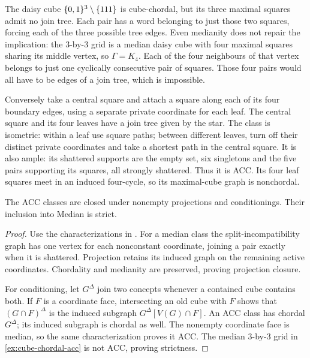 \begin{example}
\label{ex:cube-chordal-acc}
The daisy cube $\{0,1\}^3\setminus\{111\}$ is cube-chordal, but its three
maximal squares admit no join tree. Each pair has a word belonging to
just those two squares, forcing each of the three possible tree edges.
Even medianity does not repair the implication: the $3$-by-$3$ grid is
a median daisy cube with four maximal squares sharing its middle vertex,
so $\Gamma=K_4$. Each of the four neighbours of that vertex belongs
to just one cyclically consecutive pair of squares. Those four pairs
would all have to be edges of a join tree, which is impossible.

Conversely take a central square and attach a square along each of its
four boundary edges, using a separate private coordinate for each leaf.
The central square and its four leaves have a join tree given by the star.
The class is isometric: within a leaf use square paths; between different
leaves, turn off their distinct private coordinates and take a shortest
path in the central square. It is also ample: its shattered supports are
the empty set, six singletons and the five pairs supporting its squares,
all strongly shattered. Thus it is ACC. Its four leaf squares meet in
an induced four-cycle, so its maximal-cube graph is nonchordal.
\end{example}

\begin{proposition}
\label{prop:atlas-acc-closure}
The ACC classes are closed under nonempty projections and conditionings.
Their inclusion into Median is strict.
\end{proposition}
\begin{proof}
Use the characterizations in
\cite[Theorem~\textnormal{ACC characterizations}]{Survey}.
For a median class the split-incompatibility graph has one vertex for
each nonconstant coordinate, joining a pair exactly when it is shattered.
Projection retains its induced graph on the remaining active coordinates.
Chordality and medianity are preserved, proving projection closure.

For conditioning, let $G^\Delta$ join two concepts whenever a contained
cube contains both. If $F$ is a coordinate face, intersecting an old cube
with $F$ shows that $(G\cap F)^\Delta$ is the induced subgraph
$G^\Delta[V(G)\cap F]$. An ACC class has chordal $G^\Delta$;
its induced subgraph is chordal as well. The nonempty coordinate face
is median, so the same characterization proves it ACC.
The median $3$-by-$3$ grid in \cref{ex:cube-chordal-acc} is not ACC,
proving strictness.
\end{proof}

